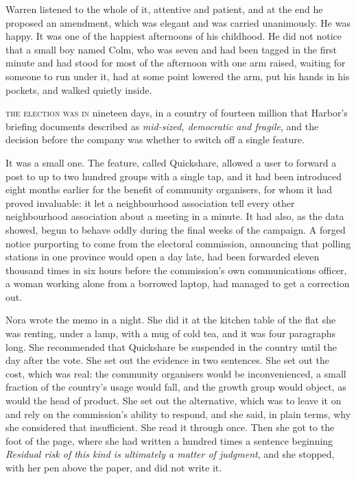 Warren listened to the whole of it, attentive and patient, and at the end he proposed an amendment, which was elegant and was carried unanimously. He was happy. It was one of the happiest afternoons of his childhood. He did not notice that a small boy named Colm, who was seven and had been tagged in the first minute and had stood for most of the afternoon with one arm raised, waiting for someone to run under it, had at some point lowered the arm, put his hands in his pockets, and walked quietly inside.


\textsc{the election was in} nineteen days, in a country of fourteen million that Harbor's briefing documents described as \emph{mid-sized, democratic and fragile}, and the decision before the company was whether to switch off a single feature.

It was a small one. The feature, called Quickshare, allowed a user to forward a post to up to two hundred groups with a single tap, and it had been introduced eight months earlier for the benefit of community organisers, for whom it had proved invaluable: it let a neighbourhood association tell every other neighbourhood association about a meeting in a minute. It had also, as the data showed, begun to behave oddly during the final weeks of the campaign. A forged notice purporting to come from the electoral commission, announcing that polling stations in one province would open a day late, had been forwarded eleven thousand times in six hours before the commission's own communications officer, a woman working alone from a borrowed laptop, had managed to get a correction out.

Nora wrote the memo in a night. She did it at the kitchen table of the flat she was renting, under a lamp, with a mug of cold tea, and it was four paragraphs long. She recommended that Quickshare be suspended in the country until the day after the vote. She set out the evidence in two sentences. She set out the cost, which was real: the community organisers would be inconvenienced, a small fraction of the country's usage would fall, and the growth group would object, as would the head of product. She set out the alternative, which was to leave it on and rely on the commission's ability to respond, and she said, in plain terms, why she considered that insufficient. She read it through once. Then she got to the foot of the page, where she had written a hundred times a sentence beginning \emph{Residual risk of this kind is ultimately a matter of judgment}, and she stopped, with her pen above the paper, and did not write it.

